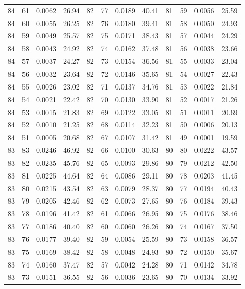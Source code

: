 \begin{tabular}{llll|llll|llll}
84 & 61 & 0.0062 & 26.94 & 82 & 77 & 0.0189 & 40.41 & 81 & 59 & 0.0056 & 25.59\\
84 & 60 & 0.0055 & 26.25 & 82 & 76 & 0.0180 & 39.41 & 81 & 58 & 0.0050 & 24.93\\
84 & 59 & 0.0049 & 25.57 & 82 & 75 & 0.0171 & 38.43 & 81 & 57 & 0.0044 & 24.29\\
84 & 58 & 0.0043 & 24.92 & 82 & 74 & 0.0162 & 37.48 & 81 & 56 & 0.0038 & 23.66\\
84 & 57 & 0.0037 & 24.27 & 82 & 73 & 0.0154 & 36.56 & 81 & 55 & 0.0033 & 23.04\\
84 & 56 & 0.0032 & 23.64 & 82 & 72 & 0.0146 & 35.65 & 81 & 54 & 0.0027 & 22.43\\
84 & 55 & 0.0026 & 23.02 & 82 & 71 & 0.0137 & 34.76 & 81 & 53 & 0.0022 & 21.84\\
84 & 54 & 0.0021 & 22.42 & 82 & 70 & 0.0130 & 33.90 & 81 & 52 & 0.0017 & 21.26\\
84 & 53 & 0.0015 & 21.83 & 82 & 69 & 0.0122 & 33.05 & 81 & 51 & 0.0011 & 20.69\\
84 & 52 & 0.0010 & 21.25 & 82 & 68 & 0.0114 & 32.23 & 81 & 50 & 0.0006 & 20.13\\
84 & 51 & 0.0005 & 20.68 & 82 & 67 & 0.0107 & 31.42 & 81 & 49 & 0.0001 & 19.59\\
83 & 83 & 0.0246 & 46.92 & 82 & 66 & 0.0100 & 30.63 & 80 & 80 & 0.0222 & 43.57\\
83 & 82 & 0.0235 & 45.76 & 82 & 65 & 0.0093 & 29.86 & 80 & 79 & 0.0212 & 42.50\\
83 & 81 & 0.0225 & 44.64 & 82 & 64 & 0.0086 & 29.11 & 80 & 78 & 0.0203 & 41.45\\
83 & 80 & 0.0215 & 43.54 & 82 & 63 & 0.0079 & 28.37 & 80 & 77 & 0.0194 & 40.43\\
83 & 79 & 0.0205 & 42.46 & 82 & 62 & 0.0073 & 27.65 & 80 & 76 & 0.0184 & 39.43\\
83 & 78 & 0.0196 & 41.42 & 82 & 61 & 0.0066 & 26.95 & 80 & 75 & 0.0176 & 38.46\\
83 & 77 & 0.0186 & 40.40 & 82 & 60 & 0.0060 & 26.26 & 80 & 74 & 0.0167 & 37.50\\
83 & 76 & 0.0177 & 39.40 & 82 & 59 & 0.0054 & 25.59 & 80 & 73 & 0.0158 & 36.57\\
83 & 75 & 0.0169 & 38.42 & 82 & 58 & 0.0048 & 24.93 & 80 & 72 & 0.0150 & 35.67\\
83 & 74 & 0.0160 & 37.47 & 82 & 57 & 0.0042 & 24.28 & 80 & 71 & 0.0142 & 34.78\\
83 & 73 & 0.0151 & 36.55 & 82 & 56 & 0.0036 & 23.65 & 80 & 70 & 0.0134 & 33.92\\

\end{tabular}
